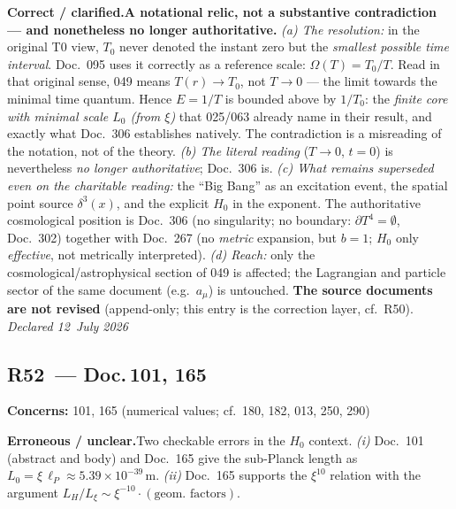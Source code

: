 \smallskip\noindent\textbf{Correct / clarified.}\quad \textbf{A notational relic, not a substantive contradiction --- and nonetheless no longer authoritative.} \emph{(a) The resolution:} in the original T0 view, $T_0$ never denoted the instant zero but the \emph{smallest possible time interval}. Doc.~095 uses it correctly as a reference scale: $\Omega(T)=T_0/T$. Read in that original sense, 049 means $T(r)\to T_0$, not $T\to 0$ --- the limit towards the minimal time quantum. Hence $E=1/T$ is bounded above by $1/T_0$: the \emph{finite core with minimal scale $L_0$ (from $\xi$)} that 025/063 already name in their result, and exactly what Doc.~306 establishes natively. The contradiction is a misreading of the notation, not of the theory. \emph{(b) The literal reading} ($T\to 0$, $t=0$) is nevertheless \emph{no longer authoritative}; Doc.~306 is. \emph{(c) What remains superseded even on the charitable reading:} the \enquote{Big Bang} as an excitation event, the spatial point source $\delta^3(x)$, and the explicit $H_0$ in the exponent. The authoritative cosmological position is Doc.~306 (no singularity; no boundary: $\partial T^4=\emptyset$, Doc.~302) together with Doc.~267 (no \emph{metric} expansion, but $b=1$; $H_0$ only \emph{effective}, not metrically interpreted). \emph{(d) Reach:} only the cosmological/astrophysical section of 049 is affected; the Lagrangian and particle sector of the same document (e.g.\ $a_\mu$) is untouched. \textbf{The source documents are not revised} (append-only; this entry is the correction layer, cf.\ R50). \emph{Declared 12~July 2026}


\medskip


\subsection*{R52~--- Doc.\,101, 165}

\noindent\textbf{Concerns:} 101, 165 (numerical values; cf.\ 180, 182, 013, 250, 290)


\smallskip\noindent\textbf{Erroneous / unclear.}\quad Two checkable errors in the $H_0$ context. \emph{(i)} Doc.~101 (abstract and body) and Doc.~165 give the sub-Planck length as $L_0 = \xi\,\ell_P \approx 5.39\times10^{-39}$\,m. \emph{(ii)} Doc.~165 supports the $\xi^{10}$ relation with the argument $L_H/L_\xi \sim \xi^{-10}\cdot(\text{geom.\ factors})$.


